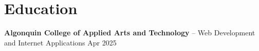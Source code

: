 \documentclass[11pt]{article}       %
\begin{document}



\section*{Education}
\textbf{Algonquin College of Applied Arts and Technology} -- Web Development and Internet Applications
\hfill Apr 2025 \\
\end{document}
